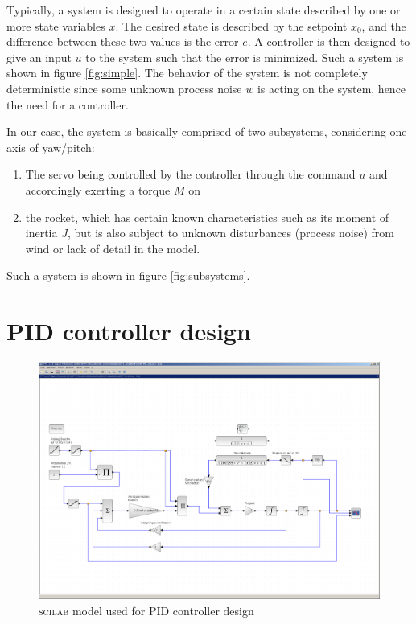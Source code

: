 \documentclass[a4paper]{article}
\begin{document}
Typically, a system is designed to operate in a certain state described by one or more state variables $x$. The desired state is described by the setpoint $x_0$, and the difference between these two values is the error $e$. A controller is then designed to give an input $u$ to the system such that the error is minimized. Such a system is shown in figure \ref{fig:simple}. The behavior of the system is not completely deterministic since some unknown process noise $w$ is acting on the system, hence the need for a controller.

In our case, the system is basically comprised of two subsystems, considering one axis of yaw/pitch:
\begin{enumerate}
\item The servo being controlled by the controller through the command $u$ and accordingly exerting a torque $M$ on
\item the rocket, which has certain known characteristics such as its moment of inertia $J$, but is also subject to unknown disturbances (process noise) from wind or lack of detail in the model.
\end{enumerate}
Such a system is shown in figure \ref{fig:subsystems}.

\section{PID controller design} \label{PID}

\begin{figure}[b!]
\begin{center}
\includegraphics[width=120mm]{model.png}
\end{center}
\caption{\textsc{scilab} model used for PID controller design} \label{fig:scilabmodel}
\end{figure}
\end{document}
